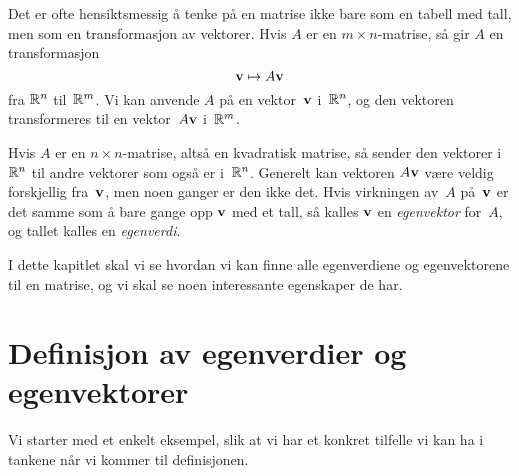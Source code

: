 

\label{ch:egenverdier-og-egenvektorer}

Det er ofte hensiktsmessig å tenke på en matrise ikke bare som en
tabell med tall, men som en transformasjon av vektorer.  Hvis $A$ er
en $m \times n$-matrise, så gir $A$ en transformasjon
\[
\mathbf{v} \mapsto A \mathbf{v}
\]
fra $\mathbb{R}^n$ til~$\mathbb{R}^m$.  Vi kan anvende $A$ på en vektor~$\mathbf{v}$
i~$\mathbb{R}^n$, og den vektoren transformeres til en vektor~$A \mathbf{v}$
i~$\mathbb{R}^m$.

Hvis $A$ er en $n \times n$-matrise, altså en kvadratisk matrise, så
sender den vektorer i~$\mathbb{R}^n$ til andre vektorer som også er i~$\mathbb{R}^n$.
Generelt kan vektoren $A \mathbf{v}$ være veldig forskjellig fra~$\mathbf{v}$,
men noen ganger er den ikke det.  Hvis virkningen av~$A$ på~$\mathbf{v}$ er
det samme som å bare gange opp $\mathbf{v}$ med et tall, så kalles $\mathbf{v}$
en \emph{egenvektor} for~$A$, og tallet kalles en \emph{egenverdi}.

I dette kapitlet skal vi se hvordan vi kan finne alle egenverdiene og
egenvektorene til en matrise, og vi skal se noen interessante
egenskaper de har.


\section*{Definisjon av egenverdier og egenvektorer}

Vi starter med et enkelt eksempel, slik at vi har et konkret tilfelle
vi kan ha i tankene når vi kommer til definisjonen.


